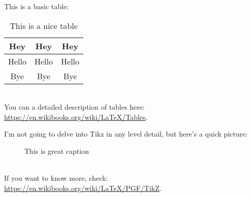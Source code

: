 \documentclass[reprint,english,notitlepage]{revtex4-1}  %
\begin{document}
This is a basic table:
\begin{table}[h]  %
\caption{This is a nice table}\label{table}
\begin{tabular}{|c|c|c|} %
\hline                    %
Hey & Hey & Hey  \\
\hline
Hello & Hello & Hello \\
\hline
Bye & Bye & Bye \\
\hline
\end{tabular}
\end{table}\\
You can a detailed description of tables here: \url{https://en.wikibooks.org/wiki/LaTeX/Tables}.

I'm not going to delve into Tikz in any level detail, but here's a quick picture:
\begin{figure}[h]
\centering  %
\caption{This is great caption}\label{figure}
\end{figure}\\
If you want to know more, check: \url{https://en.wikibooks.org/wiki/LaTeX/PGF/TikZ}.

\end{document}
